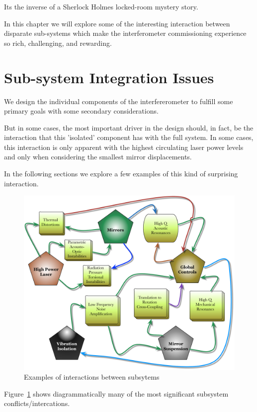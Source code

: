 Its the inverse of a Sherlock Holmes locked-room mystery story.

In this chapter we will explore some of the interesting interaction between
disparate sub-systems which make the interferometer commissioning experience
so rich, challenging, and rewarding.


\section{Sub-system Integration Issues}
We design the individual components of the interfererometer to fulfill some
primary goals with some secondary considerations.

But in some cases, the most important driver in the design should, in fact, be the
interaction that this 'isolated' component has with the full system. In some cases,
this interaction is only apparent with the highest circulating laser power levels
and only when considering the smallest mirror displacements.

In the following sections we explore a few examples of this kind of surprising
interaction.


\begin{figure}[h]
\centering
\includegraphics[width=\columnwidth]{Figures/SystemConflicts.pdf}
\caption{Examples of interactions between subsytems}
\label{fig:SystemConflicts}
\end{figure}

Figure~\ref{fig:SystemConflicts} shows diagrammatically many of the most
significant subsystem conflicts/intercations.

